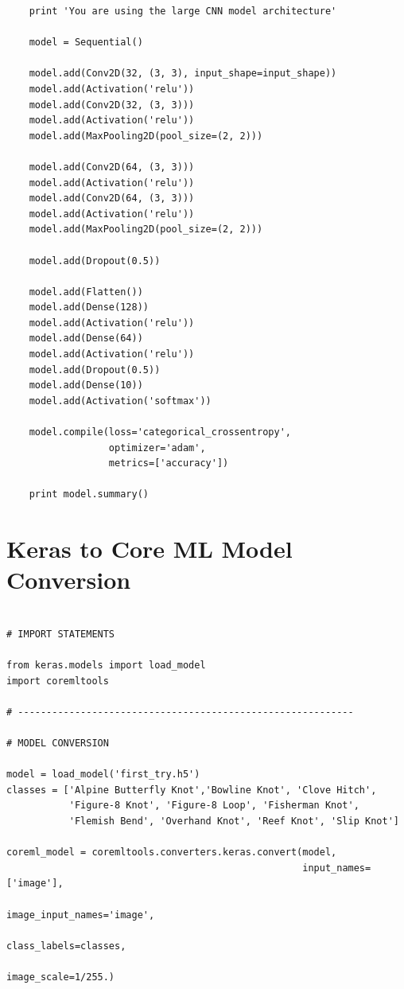 \documentclass{l4proj}
\begin{document}
\begin{appendices}
\begin{lstlisting}
    print 'You are using the large CNN model architecture'
    
    model = Sequential()
    
    model.add(Conv2D(32, (3, 3), input_shape=input_shape))
    model.add(Activation('relu'))
    model.add(Conv2D(32, (3, 3)))
    model.add(Activation('relu'))
    model.add(MaxPooling2D(pool_size=(2, 2)))
    
    model.add(Conv2D(64, (3, 3)))
    model.add(Activation('relu'))
    model.add(Conv2D(64, (3, 3)))
    model.add(Activation('relu'))
    model.add(MaxPooling2D(pool_size=(2, 2)))
    
    model.add(Dropout(0.5))
    
    model.add(Flatten())
    model.add(Dense(128))
    model.add(Activation('relu'))
    model.add(Dense(64))
    model.add(Activation('relu'))
    model.add(Dropout(0.5))
    model.add(Dense(10))
    model.add(Activation('softmax'))
    
    model.compile(loss='categorical_crossentropy',
                  optimizer='adam',
                  metrics=['accuracy'])
    
    print model.summary()
\end{lstlisting}

\chapter{Keras to Core ML Model Conversion}
\label{appendix:KerastoCoreML}
\begin{lstlisting}

# IMPORT STATEMENTS

from keras.models import load_model
import coremltools

# -----------------------------------------------------------

# MODEL CONVERSION

model = load_model('first_try.h5')
classes = ['Alpine Butterfly Knot','Bowline Knot', 'Clove Hitch', 
           'Figure-8 Knot', 'Figure-8 Loop', 'Fisherman Knot', 
           'Flemish Bend', 'Overhand Knot', 'Reef Knot', 'Slip Knot']

coreml_model = coremltools.converters.keras.convert(model,
                                                    input_names=['image'],
                                                    image_input_names='image',
                                                    class_labels=classes,
                                                    image_scale=1/255.)


\end{lstlisting}
\end{appendices}
\end{document}
